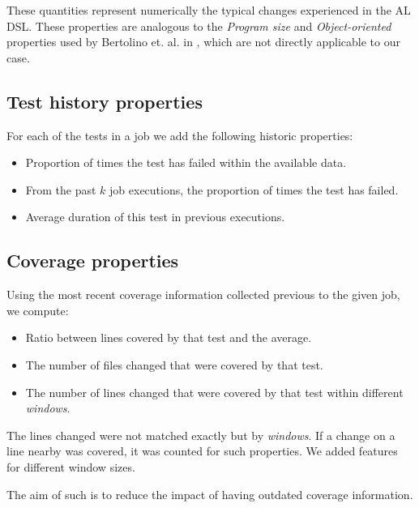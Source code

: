 These quantities represent numerically the typical changes experienced in the AL DSL. These properties are analogous to
the \emph{Program size} and \emph{Object-oriented} properties used by Bertolino et. al. in \cite{Bertolino2020LearningtoRankVR},
which are not directly applicable to our case.

\subsection{Test history properties}

For each of the tests in a job we add the following historic properties:

\begin{itemize}
    \item Proportion of times the test has failed within the available data.
    \item From the past $k$ job executions, the proportion of times the test has failed.
    \item Average duration of this test in previous executions.
\end{itemize}

\subsection{Coverage properties}

Using the most recent coverage information collected previous to
the given job, we compute:
\begin{itemize}
    \item Ratio between lines covered by that test and the average.
    \item The number of files changed that were covered by that test.
    \item The number of lines changed that were covered by that test within different \emph{windows}.
\end{itemize}

The lines changed were not matched exactly but by \emph{windows}. If a change on a
line nearby was covered, it was counted for such properties. We added features for
different window sizes.

The aim of such is to reduce the impact of having outdated coverage information.